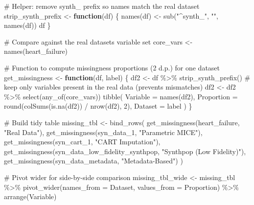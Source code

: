\documentclass[
  letterpaper,
  DIV=11,
  numbers=noendperiod]{scrartcl}
\newenvironment{Shaded}{\begin{snugshade}}{\end{snugshade}}
\newcommand{\AttributeTok}[1]{\textcolor[rgb]{0.40,0.45,0.13}{#1}}
\newcommand{\CommentTok}[1]{\textcolor[rgb]{0.37,0.37,0.37}{#1}}
\newcommand{\ControlFlowTok}[1]{\textcolor[rgb]{0.00,0.23,0.31}{\textbf{#1}}}
\newcommand{\DecValTok}[1]{\textcolor[rgb]{0.68,0.00,0.00}{#1}}
\newcommand{\FunctionTok}[1]{\textcolor[rgb]{0.28,0.35,0.67}{#1}}
\newcommand{\NormalTok}[1]{\textcolor[rgb]{0.00,0.23,0.31}{#1}}
\newcommand{\OtherTok}[1]{\textcolor[rgb]{0.00,0.23,0.31}{#1}}
\newcommand{\SpecialCharTok}[1]{\textcolor[rgb]{0.37,0.37,0.37}{#1}}
\newcommand{\StringTok}[1]{\textcolor[rgb]{0.13,0.47,0.30}{#1}}
\begin{document}
\begin{Shaded}
\begin{Highlighting}[]
\CommentTok{\# Helper: remove \textquotesingle{}synth\_\textquotesingle{} prefix so names match the real dataset}
\NormalTok{strip\_synth\_prefix }\OtherTok{\textless{}{-}} \ControlFlowTok{function}\NormalTok{(df) \{}
  \FunctionTok{names}\NormalTok{(df) }\OtherTok{\textless{}{-}} \FunctionTok{sub}\NormalTok{(}\StringTok{"\^{}synth\_"}\NormalTok{, }\StringTok{""}\NormalTok{, }\FunctionTok{names}\NormalTok{(df))}
\NormalTok{  df}
\NormalTok{\}}

\CommentTok{\# Compare against the real dataset\textquotesingle{}s variable set}
\NormalTok{core\_vars }\OtherTok{\textless{}{-}} \FunctionTok{names}\NormalTok{(heart\_failure)}

\CommentTok{\# Function to compute missingness proportions (2 d.p.) for one dataset}
\NormalTok{get\_missingness }\OtherTok{\textless{}{-}} \ControlFlowTok{function}\NormalTok{(df, label) \{}
\NormalTok{  df2 }\OtherTok{\textless{}{-}}\NormalTok{ df }\SpecialCharTok{\%\textgreater{}\%} \FunctionTok{strip\_synth\_prefix}\NormalTok{()}
  \CommentTok{\# keep only variables present in the real data (prevents mismatches)}
\NormalTok{  df2 }\OtherTok{\textless{}{-}}\NormalTok{ df2 }\SpecialCharTok{\%\textgreater{}\%} \FunctionTok{select}\NormalTok{(}\FunctionTok{any\_of}\NormalTok{(core\_vars))}
  \FunctionTok{tibble}\NormalTok{(}
    \AttributeTok{Variable   =} \FunctionTok{names}\NormalTok{(df2),}
    \AttributeTok{Proportion =} \FunctionTok{round}\NormalTok{(}\FunctionTok{colSums}\NormalTok{(}\FunctionTok{is.na}\NormalTok{(df2)) }\SpecialCharTok{/} \FunctionTok{nrow}\NormalTok{(df2), }\DecValTok{2}\NormalTok{),}
    \AttributeTok{Dataset    =}\NormalTok{ label}
\NormalTok{  )}
\NormalTok{\}}

\CommentTok{\# Build tidy table}
\NormalTok{missing\_tbl }\OtherTok{\textless{}{-}} \FunctionTok{bind\_rows}\NormalTok{(}
  \FunctionTok{get\_missingness}\NormalTok{(heart\_failure, }\StringTok{"Real Data"}\NormalTok{),}
  \FunctionTok{get\_missingness}\NormalTok{(syn\_data\_1, }\StringTok{"Parametric MICE"}\NormalTok{),}
  \FunctionTok{get\_missingness}\NormalTok{(syn\_cart\_1, }\StringTok{"CART Imputation"}\NormalTok{),}
  \FunctionTok{get\_missingness}\NormalTok{(syn\_data\_low\_fidelity\_synthpop, }\StringTok{"Synthpop (Low Fidelity)"}\NormalTok{),}
  \FunctionTok{get\_missingness}\NormalTok{(syn\_data\_metadata, }\StringTok{"Metadata{-}Based"}\NormalTok{)}
\NormalTok{)}

\CommentTok{\# Pivot wider for side{-}by{-}side comparison}
\NormalTok{missing\_tbl\_wide }\OtherTok{\textless{}{-}}\NormalTok{ missing\_tbl }\SpecialCharTok{\%\textgreater{}\%}
  \FunctionTok{pivot\_wider}\NormalTok{(}\AttributeTok{names\_from =}\NormalTok{ Dataset, }\AttributeTok{values\_from =}\NormalTok{ Proportion) }\SpecialCharTok{\%\textgreater{}\%}
  \FunctionTok{arrange}\NormalTok{(Variable)}


\end{Highlighting}
\end{Shaded}
\end{document}
